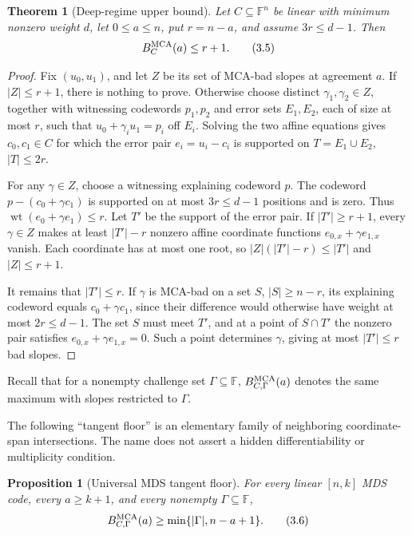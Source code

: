 \documentclass[11pt,a4paper]{amsart}
\numberwithin{equation}{section}
\newtheorem{theorem}{Theorem}[section]
\newtheorem{proposition}[proposition]{Proposition}
\theoremstyle{remark}
\DeclareMathOperator{\wt}{wt}
\newcommand{\F}{\mathbb F}
\newcommand{\abs}[1]{\lvert #1\rvert}
\begin{document}
\begin{theorem}[Deep-regime upper bound]\label{thm:deep-regime-upper}
Let \(C\subseteq\F^n\) be linear with minimum nonzero weight \(d\), let
\(0\le a\le n\), put \(r=n-a\), and assume \(3r\le d-1\).  Then
\[
 B_C^{\rm MCA}(a)\le r+1.
 \tag{3.5}\label{eq:deep-upper}
\]
\end{theorem}

\begin{proof}
Fix \((u_0,u_1)\), and let \(Z\) be its set of MCA-bad slopes at agreement
\(a\).  If \(\abs Z\le r+1\), there is nothing to prove.  Otherwise choose
distinct \(\gamma_1,\gamma_2\in Z\), together with witnessing codewords
\(p_1,p_2\) and error sets \(E_1,E_2\), each of size at most \(r\), such
that \(u_0+\gamma_i u_1=p_i\) off \(E_i\).  Solving the two affine
equations gives \(c_0,c_1\in C\) for which the error pair
\(e_i=u_i-c_i\) is supported on \(T=E_1\cup E_2\), \(\abs T\le2r\).

For any \(\gamma\in Z\), choose a witnessing explaining codeword \(p\).  The
codeword \(p-(c_0+\gamma c_1)\) is supported on at most \(3r\le d-1\)
positions and is zero.  Thus \(\wt(e_0+\gamma e_1)\le r\).  Let \(T'\) be
the support of the error pair.  If \(\abs{T'}\ge r+1\), every
\(\gamma\in Z\) makes at least \(\abs{T'}-r\) nonzero affine coordinate
functions \(e_{0,x}+\gamma e_{1,x}\) vanish.  Each coordinate has at most
one root, so \(\abs Z(\abs{T'}-r)\le\abs{T'}\) and \(\abs Z\le r+1\).

It remains that \(\abs{T'}\le r\).  If \(\gamma\) is MCA-bad on a set
\(S\), \(\abs S\ge n-r\), its explaining codeword equals
\(c_0+\gamma c_1\), since their difference would otherwise have weight at
most \(2r\le d-1\).  The set \(S\) must meet \(T'\), and at a point of
\(S\cap T'\) the nonzero pair satisfies
\(e_{0,x}+\gamma e_{1,x}=0\).  Such a point determines \(\gamma\), giving
at most \(\abs{T'}\le r\) bad slopes.
\end{proof}

Recall that for a nonempty challenge set \(\Gamma\subseteq\F\),
\(B_{C,\Gamma}^{\rm MCA}(a)\) denotes the same maximum with slopes restricted to
\(\Gamma\).

The following ``tangent floor'' is an elementary family of neighboring
coordinate-span intersections.  The name does not assert a hidden
differentiability or multiplicity condition.

\begin{proposition}[Universal MDS tangent floor]\label{prop:universal-tangent-floor}
For every linear \([n,k]\) MDS code, every \(a\ge k+1\), and every nonempty
\(\Gamma\subseteq\F\),
\[
 B_{C,\Gamma}^{\rm MCA}(a)
 \ge\min\{\abs\Gamma,n-a+1\}.
 \tag{3.6}\label{eq:tangent-floor}
\]
\end{proposition}
\end{document}
